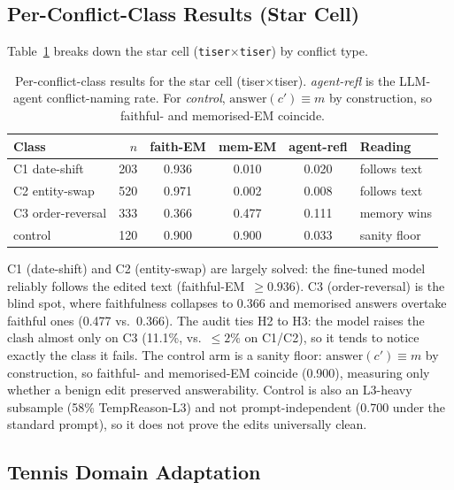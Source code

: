 \documentclass[conference]{IEEEtran}
\begin{document}
\subsection{Per-Conflict-Class Results (Star Cell)}

Table~\ref{tab:perclass} breaks down the star cell (\texttt{tiser}$\times$\texttt{tiser}) by conflict type.

\begin{table}[t]
\centering
\caption{Per-conflict-class results for the star cell (tiser$\times$tiser). \emph{agent-refl} is the LLM-agent conflict-naming rate. For \emph{control}, $\text{answer}(c'){\equiv}m$ by construction, so faithful- and memorised-EM coincide.}
\label{tab:perclass}
\setlength{\tabcolsep}{4pt}
{\footnotesize
\begin{tabular}{lrcccl}
\toprule
\textbf{Class} & \textbf{$n$} & \textbf{faith-EM} & \textbf{mem-EM} & \textbf{agent-refl} & \textbf{Reading} \\
\midrule
C1 date-shift      & 203 & 0.936 & 0.010 & 0.020 & follows text \\
C2 entity-swap     & 520 & 0.971 & 0.002 & 0.008 & follows text \\
C3 order-reversal  & 333 & 0.366 & 0.477 & 0.111 & memory wins  \\
control            & 120 & 0.900 & 0.900 & 0.033 & sanity floor \\
\bottomrule
\end{tabular}
}
\end{table}

C1 (date-shift) and C2 (entity-swap) are largely solved: the fine-tuned model reliably follows the edited text (faithful-EM~${\geq}0.936$). C3 (order-reversal) is the blind spot, where faithfulness collapses to 0.366 and memorised answers overtake faithful ones (0.477 vs.\ 0.366). The audit ties H2 to H3: the model raises the clash almost only on C3 (11.1\%, vs.\ ${\leq}2\%$ on C1/C2), so it tends to notice exactly the class it fails. The control arm is a sanity floor: $\text{answer}(c'){\equiv}m$ by construction, so faithful- and memorised-EM coincide (0.900), measuring only whether a benign edit preserved answerability. Control is also an L3-heavy subsample (58\% TempReason-L3) and not prompt-independent (0.700 under the standard prompt), so it does not prove the edits universally clean.

\subsection{Tennis Domain Adaptation}
\end{document}
